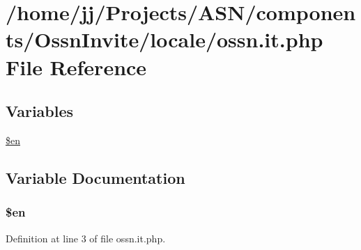 \hypertarget{components_2_ossn_invite_2locale_2ossn_8it_8php}{}\section{/home/jj/\+Projects/\+A\+S\+N/components/\+Ossn\+Invite/locale/ossn.it.\+php File Reference}
\label{components_2_ossn_invite_2locale_2ossn_8it_8php}
\subsection*{Variables}
\begin{DoxyCompactItemize}
\item 
\hyperlink{components_2_ossn_invite_2locale_2ossn_8it_8php_a48abc714dfb71c8fffa83cf49f452115}{\$en}
\end{DoxyCompactItemize}


\subsection{Variable Documentation}
\subsubsection[{\texorpdfstring{\$en}{$en}}]{\setlength{\rightskip}{0pt plus 5cm}\$en}\hypertarget{components_2_ossn_invite_2locale_2ossn_8it_8php_a48abc714dfb71c8fffa83cf49f452115}{}\label{components_2_ossn_invite_2locale_2ossn_8it_8php_a48abc714dfb71c8fffa83cf49f452115}


Definition at line 3 of file ossn.\+it.\+php.


